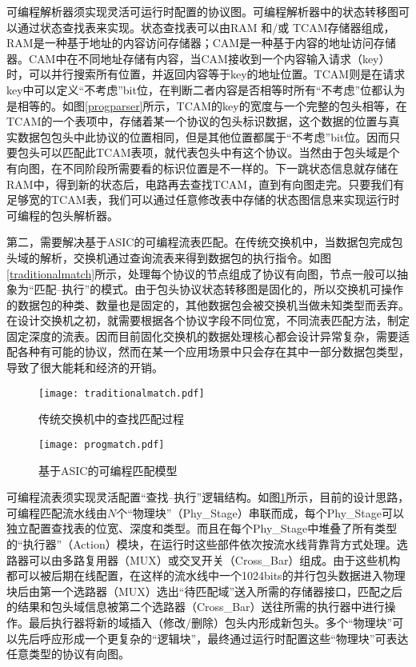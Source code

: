 可编程解析器须实现灵活可运行时配置的协议图。可编程解析器中的状态转移图可以通过状态查找表来实现。状态查找表可以由RAM 和/或 TCAM存储器组成，RAM是一种基于地址的内容访问存储器；CAM是一种基于内容的地址访问存储器。CAM中在不同地址存储有内容，当CAM接收到一个内容输入请求（key）时，可以并行搜索所有位置，并返回内容等于key的地址位置。TCAM则是在请求key中可以定义“不考虑”bit位，在判断二者内容是否相等时所有“不考虑”位都认为是相等的。如图\ref{progparser}所示，TCAM的key的宽度与一个完整的包头相等，在TCAM的一个表项中，存储着某一个协议的包头标识数据，这个数据的位置与真实数据包包头中此协议的位置相同，但是其他位置都属于“不考虑”bit位。因而只要包头可以匹配此TCAM表项，就代表包头中有这个协议。当然由于包头域是个有向图，在不同阶段所需要看的标识位置是不一样的。下一跳状态信息就存储在RAM中，得到新的状态后，电路再去查找TCAM，直到有向图走完。只要我们有足够宽的TCAM表，我们可以通过任意修改表中存储的状态图信息来实现运行时可编程的包头解析器。

第二，需要解决基于ASIC的可编程流表匹配。在传统交换机中，当数据包完成包头域的解析，交换机通过查询流表来得到数据包的执行指令。如图\ref{traditionalmatch}所示，处理每个协议的节点组成了协议有向图，节点一般可以抽象为“匹配--执行”的模式。由于包头协议状态转移图是固化的，所以交换机可操作的数据包的种类、数量也是固定的，其他数据包会被交换机当做未知类型而丢弃。在设计交换机之初，就需要根据各个协议字段不同位宽，不同流表匹配方法，制定固定深度的流表。因而目前固化交换机的数据处理核心都会设计异常复杂，需要适配各种有可能的协议，然而在某一个应用场景中只会存在其中一部分数据包类型，导致了很大能耗和经济的开销。



\begin{figure}[htbp]
	\centering
	\begin{minipage}[t]{0.48\textwidth}
		\centering
		\texttt{[image: traditionalmatch.pdf]}
		\caption{传统交换机中的查找匹配过程} \label{traditionalmatch}
	\end{minipage}
	\begin{minipage}[t]{0.48\textwidth}
		\centering
		\texttt{[image: progmatch.pdf]}%
		\caption{基于ASIC的可编程匹配模型} \label{progmatch}
	\end{minipage}
\end{figure}

可编程流表须实现灵活配置“查找--执行”逻辑结构。如图\ref{progmatch}所示，目前的设计思路，可编程匹配流水线由$N$个“物理块”（Phy\_Stage）串联而成，每个Phy\_Stage可以独立配置查找表的位宽、深度和类型。而且在每个Phy\_Stage中堆叠了所有类型的“执行器”（Action）模块，在运行时这些部件依次按流水线背靠背方式处理。选路器可以由多路复用器（MUX）或交叉开关（Cross\_Bar）组成。由于这些机构都可以被后期在线配置，在这样的流水线中一个1024bits的并行包头数据进入物理块后由第一个选路器（MUX）选出“待匹配域”送入所需的存储器接口，匹配之后的结果和包头域信息被第二个选路器（Cross\_Bar）送往所需的执行器中进行操作。最后执行器将新的域插入（修改/删除）包头内形成新包头。多个“物理块”可以先后呼应形成一个更复杂的“逻辑块”，最终通过运行时配置这些“物理块”可表达任意类型的协议有向图。


